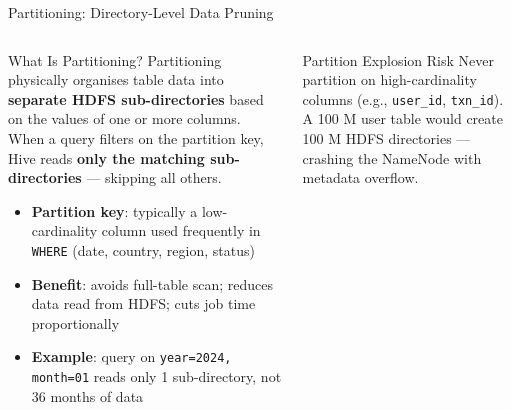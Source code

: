 \documentclass[aspectratio=169,10pt]{beamer}
\begin{document}
\begin{frame}{Partitioning: Directory-Level Data Pruning}
  \begin{columns}[T]
      \begin{block}{What Is Partitioning?}
        Partitioning physically organises table data into \textbf{separate HDFS sub-directories} based on the values of one or more columns.  When a query filters on the partition key, Hive reads \textbf{only the matching sub-directories} — skipping all others.
        \vspace{4pt}
        \begin{itemize}
          \item \textbf{Partition key}: typically a low-cardinality column used frequently in \texttt{WHERE} (date, country, region, status)
          \item \textbf{Benefit}: avoids full-table scan; reduces data read from HDFS; cuts job time proportionally
          \item \textbf{Example}: query on \texttt{year=2024, month=01} reads only 1 sub-directory, not 36 months of data
        \end{itemize}
      \end{block}
      \vspace{4pt}
      \begin{alertblock}{Partition Explosion Risk}
        \small Never partition on high-cardinality columns (e.g., \texttt{user\_id}, \texttt{txn\_id}).  A 100 M user table would create 100 M HDFS directories — crashing the NameNode with metadata overflow.
      \end{alertblock}


\end{columns}
\end{frame}
\end{document}
